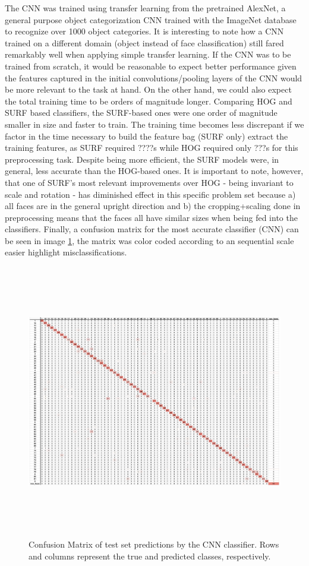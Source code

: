 \documentclass[11pt]{article}
\begin{document}
        The CNN was trained using transfer learning from the pretrained AlexNet, a general purpose object categorization CNN trained with the ImageNet database to recognize over 1000 object categories. It is interesting to note how a CNN trained on a different domain (object instead of face classification) still fared remarkably well when applying simple transfer learning. If the CNN was to be trained from scratch, it would be reasonable to expect better performance given the features captured in the initial convolutions/pooling layers of the CNN would be more relevant to the task at hand. On the other hand, we could also expect the total training time to be orders of magnitude longer.
        Comparing HOG and SURF based classifiers, the SURF-based ones were one order of magnitude smaller in size and faster to train. The training time becomes less discrepant if we factor in the time necessary to build the feature bag (SURF only) extract the training features, as SURF required ????s while HOG required only ???s for this preprocessing task. Despite being more efficient, the SURF models were, in general, less accurate than the HOG-based ones. It is important to note, however, that one of SURF's most relevant improvements over HOG - being invariant to scale and rotation - has diminished effect in this specific problem set because a) all faces are in the general upright direction and b) the cropping+scaling done in preprocessing means that the faces all have similar sizes when being fed into the classifiers.
        Finally, a confusion matrix for the most accurate classifier (CNN) can be seen in image \ref{fig:results:confusion_matrix}, the matrix was color coded according to an sequential scale easier highlight misclassifications.

        \begin{figure}[t]
            \centering
            \includegraphics[height=12cm]{./Images/results/confusion_matrix.png}
            \caption{Confusion Matrix of test set predictions by the CNN classifier. Rows and columns represent the true and predicted classes, respectively.}
            \label{fig:results:confusion_matrix}
        \end{figure}
\end{document}
